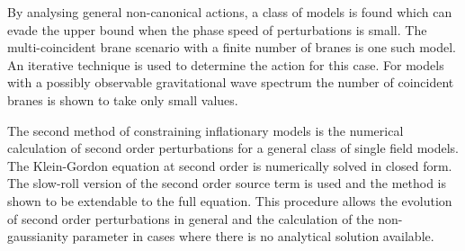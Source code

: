% 
By analysing general non-canonical actions, a class of models is found which can
evade the upper bound when the phase speed of perturbations is small. The multi-coincident brane
scenario with a finite number of branes is one such model. An iterative technique is used to
determine the action for this case.
For models with a possibly observable gravitational wave spectrum the number of coincident branes is
shown to take only small values. 

The second method of constraining inflationary models is the numerical calculation
of second order perturbations for a general class of single field models.
The Klein-Gordon equation at second order is numerically solved in closed form. 
The slow-roll version of the second order source term is used and the method is
shown to be extendable to the full equation.
This procedure allows the evolution of second order
perturbations in general and the calculation of the non-gaussianity parameter in cases
where there is no analytical solution available.  


